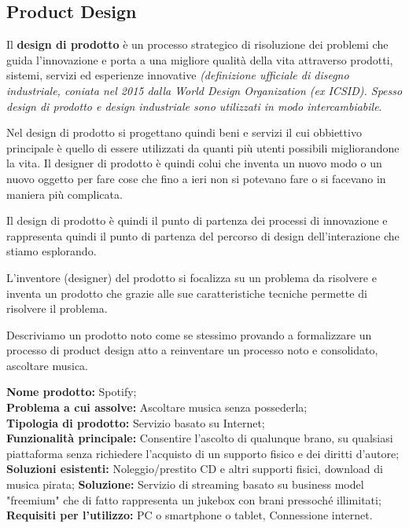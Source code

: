 \subsection{Product Design}
Il \textbf{design di prodotto} è un processo strategico di risoluzione dei problemi che guida l'innovazione e porta a una migliore qualità della vita attraverso prodotti, sistemi, servizi ed esperienze innovative \textit{(definizione ufficiale di disegno industriale, coniata nel 2015 dalla World Design Organization (ex ICSID). Spesso design di prodotto e design industriale sono utilizzati in modo intercambiabile}. 

Nel design di prodotto si progettano quindi beni e servizi il cui obbiettivo principale è quello di essere utilizzati da quanti più utenti possibili migliorandone la vita. Il designer di prodotto è quindi colui che inventa un nuovo modo o un nuovo oggetto per fare cose che fino a ieri non si potevano fare o si facevano in maniera più complicata.

Il design di prodotto è quindi il punto di partenza dei processi di innovazione e rappresenta quindi il punto di partenza del percorso di design dell'interazione che stiamo esplorando.

L'inventore (designer) del prodotto si focalizza su un problema da risolvere e inventa un prodotto che grazie alle sue caratteristiche tecniche permette di risolvere il problema.

Descriviamo un prodotto noto come se stessimo provando a formalizzare un processo di product design atto a reinventare un processo noto e consolidato, ascoltare musica. 

\begin{flushleft}
\textbf{Nome prodotto:} Spotify;\\
\textbf{Problema a cui assolve:} Ascoltare musica senza possederla;\\
\textbf{Tipologia di prodotto:} Servizio basato su Internet;\\
\textbf{Funzionalità principale:} Consentire l'ascolto di qualunque brano, su qualsiasi piattaforma senza richiedere l'acquisto di un supporto fisico e dei diritti d'autore;\\
\textbf{Soluzioni esistenti:} Noleggio/prestito CD e altri supporti fisici, download di musica pirata;
\textbf{Soluzione:} Servizio di streaming basato su business model "freemium" che di fatto rappresenta un jukebox con brani pressoché illimitati;
\textbf{Requisiti per l'utilizzo:} PC o smartphone o tablet, Connessione internet. 
\end{flushleft}

